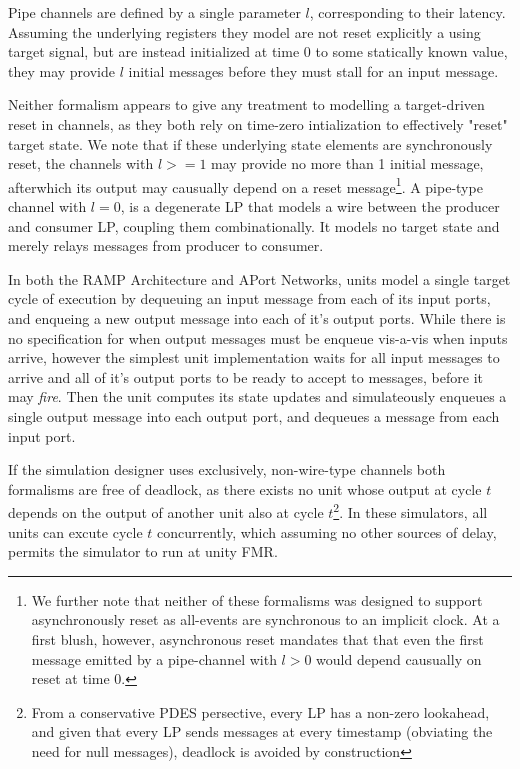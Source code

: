 Pipe channels are defined by a single parameter $l$, corresponding to their
latency. Assuming the underlying registers they model are not reset
explicitly a using target signal, but are instead initialized at time 0 to some
statically known value, they may provide $l$ initial messages before they must
stall for an input message.

Neither formalism appears to give any treatment to modelling a target-driven reset in
channels, as they both rely on time-zero intialization to effectively
"reset" target state.  We note that if these underlying state elements are
synchronously reset, the channels with $l >= 1$ may provide no more than 1
initial message, afterwhich its output may causually depend on a reset
message\footnote{We further note that neither of these formalisms was designed
to support asynchronously reset as all-events are synchronous to an implicit
clock. At a first blush, however, asynchronous reset mandates that that even
the first message emitted by a pipe-channel with $l > 0$ would depend causually
on reset at time 0.}. A pipe-type channel with $l = 0$, is a degenerate LP that models a wire between the producer and consumer LP, coupling them combinationally.
It models no target state and merely relays messages from producer to consumer.


In both the RAMP Architecture and APort Networks, units model a single target
cycle of execution by dequeuing an input message from each of its input ports,
and enqueing a new output message into each of it's output ports. While there
is no specification for when output messages must be enqueue vis-a-vis when
inputs arrive, however the simplest unit implementation waits for all input
messages to arrive and all of it's output ports to be ready to accept to
messages, before it may \emph{fire}. Then the unit computes its state updates
and simulateously enqueues a single output message into each output port, and
dequeues a message from each input port.


If the simulation designer uses exclusively, non-wire-type channels both
formalisms are free of deadlock, as there exists no unit whose output at cycle
$t$ depends on the output of another unit also at cycle $t$\footnote{From a conservative PDES persective, every LP has a non-zero lookahead, and given that every LP sends messages 
at every timestamp (obviating the need for null messages), deadlock is avoided by construction}. In these
simulators, all units can excute cycle $t$ concurrently, which assuming no
other sources of delay, permits the simulator to run at unity FMR.

